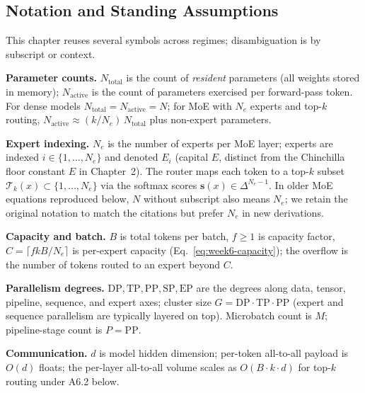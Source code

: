 \subsection{Notation and Standing Assumptions}
\label{sec:week6-notation}

\begin{notationbox}
This chapter reuses several symbols across regimes; disambiguation is
by subscript or context.

\textbf{Parameter counts.}
$N_{\mathrm{total}}$ is the count of \emph{resident} parameters (all
weights stored in memory); $N_{\mathrm{active}}$ is the count of
parameters exercised per forward-pass token. For dense models
$N_{\mathrm{total}} = N_{\mathrm{active}} = N$; for MoE with $N_e$
experts and top-$k$ routing,
$N_{\mathrm{active}} \approx (k/N_e)\,N_{\mathrm{total}}$ plus
non-expert parameters.

\textbf{Expert indexing.}
$N_e$ is the number of experts per MoE layer; experts are indexed
$i \in \{1, \ldots, N_e\}$ and denoted $E_i$ (capital $E$, distinct
from the Chinchilla floor constant $E$ in Chapter~2). The router maps
each token to a top-$k$ subset $\mathcal{T}_k(x) \subset \{1, \ldots,
N_e\}$ via the softmax scores $\mathbf{s}(x) \in \Delta^{N_e - 1}$.
In older MoE equations reproduced below, $N$ without subscript also
means $N_e$; we retain the original notation to match the citations
but prefer $N_e$ in new derivations.

\textbf{Capacity and batch.}
$B$ is total tokens per batch, $f \ge 1$ is capacity factor,
$C = \lceil f k B / N_e \rceil$ is per-expert capacity
(Eq.~\eqref{eq:week6-capacity}); the overflow is the number of tokens
routed to an expert beyond $C$.

\textbf{Parallelism degrees.}
$\mathrm{DP}, \mathrm{TP}, \mathrm{PP}, \mathrm{SP}, \mathrm{EP}$ are
the degrees along data, tensor, pipeline, sequence, and expert axes;
cluster size $G = \mathrm{DP} \cdot \mathrm{TP} \cdot \mathrm{PP}$
(expert and sequence parallelism are typically layered on top).
Microbatch count is $M$; pipeline-stage count is $P = \mathrm{PP}$.

\textbf{Communication.}
$d$ is model hidden dimension; per-token all-to-all payload is $O(d)$
floats; the per-layer all-to-all volume scales as $O(B \cdot k \cdot d)$
for top-$k$ routing under A6.2 below.


\end{notationbox}
